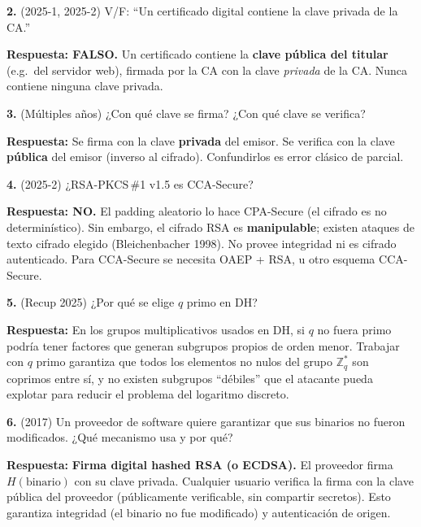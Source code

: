 \documentclass[11pt,a4paper]{article}
\begin{document}
\begin{examen}
\textbf{2.} (2025-1, 2025-2) V/F: ``Un certificado digital contiene la clave
privada de la CA.''

\textbf{Respuesta: FALSO.} Un certificado contiene la \textbf{clave pública del
titular} (e.g.\ del servidor web), firmada por la CA con la clave \emph{privada} de
la CA. Nunca contiene ninguna clave privada.
\end{examen}

\begin{examen}
\textbf{3.} (Múltiples años) ¿Con qué clave se firma? ¿Con qué clave se verifica?

\textbf{Respuesta:} Se firma con la clave \textbf{privada} del emisor. Se verifica
con la clave \textbf{pública} del emisor (inverso al cifrado). Confundirlos es error
clásico de parcial.
\end{examen}

\begin{examen}
\textbf{4.} (2025-2) ¿RSA-PKCS\,\#1 v1.5 es CCA-Secure?

\textbf{Respuesta: NO.} El padding aleatorio lo hace CPA-Secure (el cifrado es no
determinístico). Sin embargo, el cifrado RSA es \textbf{manipulable}; existen ataques
de texto cifrado elegido (Bleichenbacher 1998). No provee integridad ni es cifrado
autenticado. Para CCA-Secure se necesita OAEP + RSA, u otro esquema CCA-Secure.
\end{examen}

\begin{examen}
\textbf{5.} (Recup 2025) ¿Por qué se elige $q$ primo en DH?

\textbf{Respuesta:} En los grupos multiplicativos usados en DH, si $q$ no fuera primo
podría tener factores que generan subgrupos propios de orden menor. Trabajar con
$q$ primo garantiza que todos los elementos no nulos del grupo $\mathbb{Z}_q^*$ son
coprimos entre sí, y no existen subgrupos ``débiles'' que el atacante pueda explotar
para reducir el problema del logaritmo discreto.
\end{examen}

\begin{examen}
\textbf{6.} (2017) Un proveedor de software quiere garantizar que sus binarios no
fueron modificados. ¿Qué mecanismo usa y por qué?

\textbf{Respuesta:} \textbf{Firma digital hashed RSA (o ECDSA).} El proveedor firma
$H(\text{binario})$ con su clave privada. Cualquier usuario verifica la firma con la
clave pública del proveedor (públicamente verificable, sin compartir secretos). Esto
garantiza integridad (el binario no fue modificado) y autenticación de origen.
\end{examen}
\end{document}
